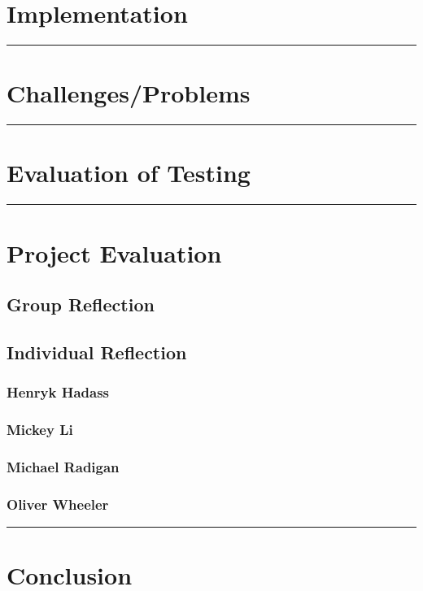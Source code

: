 \documentclass[11pt]{article}
\begin{document}
\section{Implementation}


\noindent
\rule{8cm}{0.6pt}
\section{Challenges/Problems}

\noindent
\rule{8cm}{0.6pt}
\section{Evaluation of Testing}

\noindent
\rule{8cm}{0.6pt}
\section{Project Evaluation}

\subsection{Group Reflection}

\subsection{Individual Reflection}

\subsubsection*{Henryk Hadass}

\subsubsection*{Mickey Li}

\subsubsection*{Michael Radigan}

\subsubsection*{Oliver Wheeler}

\noindent
\rule{8cm}{0.6pt}
\section{Conclusion}
\end{document}
